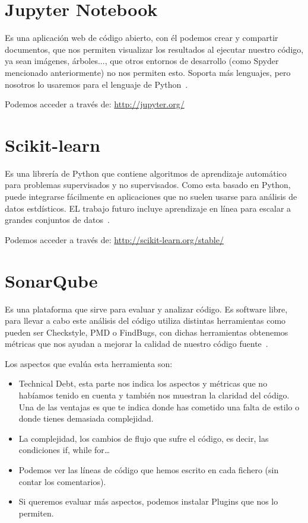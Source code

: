 \section{Jupyter Notebook}
Es una aplicación web de código abierto, con él podemos crear y compartir documentos, que nos permiten visualizar los resultados al ejecutar nuestro código, ya sean imágenes, árboles..., que otros entornos de desarrollo (como Spyder mencionado anteriormente) no nos permiten esto.
Soporta más lenguajes, pero nosotros lo usaremos para el lenguaje de Python~\cite{jupyter}.

Podemos acceder a través de: 
\url{http://jupyter.org/}	

\section{Scikit-learn}
Es una librería de Python que contiene algoritmos de aprendizaje automático para problemas supervisados y no supervisados. Como esta basado en Python, puede integrarse fácilmente en aplicaciones que no suelen usarse para análisis de datos estdísticos. EL trabajo futuro incluye aprendizaje en línea para escalar a grandes conjuntos de datos~\cite{scikitlearn}. 

Podemos acceder a través de: 
\url{http://scikit-learn.org/stable/}

\section{SonarQube}
Es una plataforma que sirve para evaluar y analizar código. Es software libre, para llevar a cabo este análisis del código utiliza distintas herramientas como pueden ser Checkstyle, PMD o FindBugs, con dichas herramientas obtenemos métricas que nos ayudan a mejorar la calidad de nuestro código fuente~\cite{wiki:sonarqube}.

Los aspectos que evalúa esta herramienta son:
\begin{itemize}
	\item Technical Debt, esta parte nos indica los aspectos y métricas que no habíamos tenido en cuenta y también nos muestran la claridad del código. Una de las ventajas es que te indica donde has cometido una falta de estilo o donde tienes demasiada complejidad.
	\item La complejidad, los cambios de flujo que sufre el código, es decir, las condiciones if, while for… 
	\item Podemos ver las líneas de código que hemos escrito en cada fichero (sin contar los comentarios).
	\item Si queremos evaluar más aspectos, podemos instalar Plugins que nos lo permiten.
\end{itemize}

